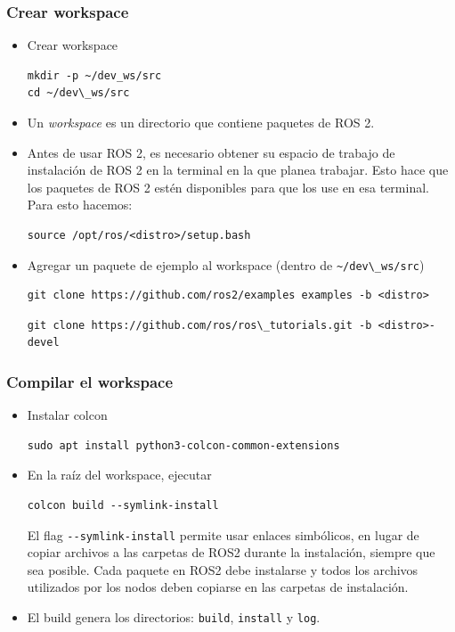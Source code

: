 \begin{frame}[fragile]
    \frametitle{Crear workspace}
    
    \begin{itemize}
        \item Crear workspace
        \begin{lstlisting}[style=bash] 
mkdir -p ~/dev_ws/src
cd ~/dev\_ws/src
        \end{lstlisting}
        
        \item Un \emph{workspace} es un directorio que contiene paquetes de ROS 2.
        \item Antes de usar ROS 2, es necesario obtener su espacio de trabajo de instalación de ROS 2 en la terminal en la que planea trabajar. Esto hace que los paquetes de ROS 2 estén disponibles para que los use en esa terminal. Para esto hacemos:
        
\begin{lstlisting}[style=bash] 
source /opt/ros/<distro>/setup.bash
\end{lstlisting}
        


\item Agregar un paquete de ejemplo al workspace (dentro de \lstinline[style=bash]{~/dev\_ws/src})
\begin{lstlisting}[style=bash] 
git clone https://github.com/ros2/examples examples -b <distro>
\end{lstlisting}

\begin{lstlisting}[style=bash] 
git clone https://github.com/ros/ros\_tutorials.git -b <distro>-devel
\end{lstlisting}
    \end{itemize}
\end{frame}


\begin{frame}[fragile]
	\frametitle{Compilar el workspace}
\begin{itemize}
    \item Instalar colcon
\begin{lstlisting}[style=bash] 
sudo apt install python3-colcon-common-extensions
\end{lstlisting}

    \item En la raíz del workspace, ejecutar
\begin{lstlisting}[style=bash] 
colcon build --symlink-install
\end{lstlisting}

	El flag \lstinline[style=bash]{--symlink-install} permite usar enlaces simbólicos, en lugar de copiar archivos a las carpetas de ROS2 durante la instalación, siempre que sea posible. Cada paquete en ROS2 debe instalarse y todos los archivos utilizados por los nodos deben copiarse en las carpetas de instalación.
	
	\item El build genera los directorios: \lstinline[style=bash]{build}, \lstinline[style=bash]{install} y \lstinline[style=bash]{log}.
\end{itemize}
\end{frame}

